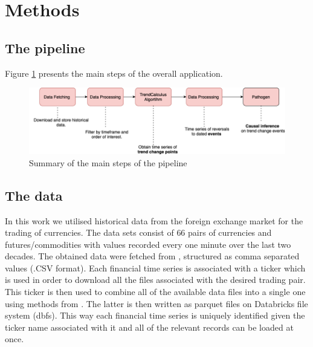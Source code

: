 \documentclass[a4, 11pt]{article}
\begin{document}
\section{Methods}
\subsection{The pipeline}
Figure \ref{fig:pipeline} presents the main steps of the overall application.  
\vspace{0.2in}
\begin{figure}[!ht]
    \centering
    \includegraphics[width=1\textwidth]{Images/Pipeline.png}
    \caption{Summary of the main steps of the pipeline}
    \label{fig:pipeline}
\end{figure}
 
 
\subsection{The data}
In this work we utilised historical data from the foreign exchange market \cite{Forex} for the trading of currencies. The data sets consist of $66$ pairs of currencies and futures/commodities with values recorded every one minute over the last two decades. The obtained data were fetched from \cite{HistData}, structured as comma separated values (.CSV format). Each financial time series is associated with a ticker which is used in order to download all the files associated with the desired trading pair. This ticker is then used to combine all of the available data files into a single one using methods from \cite{FX1}. The latter is then written as parquet files on Databricks file system (dbfs). This way each financial time series is uniquely identified given the ticker name associated with it and all of the relevant records can be loaded at once. 
\end{document}
